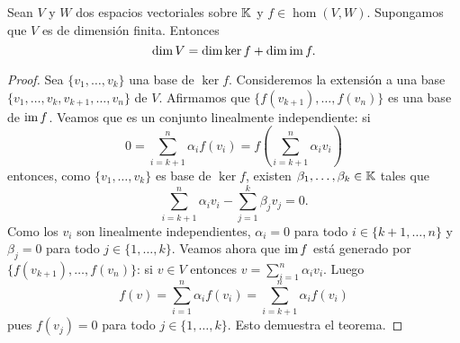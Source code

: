 \begin{thm}
	\label{thm:dimension}
	Sean $V$ y $W$ dos espacios vectoriales sobre $\mathbb{K}$ y $f\in\hom(V,W)$.
	Supongamos que $V$ es de dimensión finita.  Entonces
	\[
		\dim V=\dim\ker f+\dim\operatorname{im} f.
	\]

    \begin{proof} 
        Sea $\{v_1,\dots,v_k\}$ una base de $\ker f$. Consideremos la
        extensión a una base $\{v_1,\dots,v_k,v_{k+1},\dots,v_n\}$ de $V$.
        Afirmamos que $\{f(v_{k+1}),\dots,f(v_n)\}$ es una base de $\operatorname{im} f$. 
        Veamos que es un conjunto linealmente independiente: si 
        \[
            0=\sum_{i=k+1}^n\alpha_if(v_i)=f\left(\sum_{i=k+1}^n\alpha_iv_i\right)
        \]
        entonces, como $\{v_1,\dots,v_k\}$ es base de $\ker f$, 
        existen $\beta_1,\dots,\beta_k\in\mathbb{K}$ tales que 
        \[
            \sum_{i=k+1}^n \alpha_i v_i-\sum_{j=1}^k \beta_jv_j=0.
        \]
        Como los $v_i$ son linealmente independientes, $\alpha_i=0$ para todo $i\in\{k+1,\dots,n\}$ y $\beta_j=0$ para
        todo $j\in\{1,\dots,k\}$. Veamos ahora que $\operatorname{im} f$ está generado por $\{f(v_{k+1}),\dots,f(v_n)\}$: si $v\in V$ 
        entonces $v=\sum_{i=1}^n\alpha_iv_i$. Luego 
        \[
            f(v)=\sum_{i=1}^n\alpha_if(v_i)=\sum_{i=k+1}^n\alpha_if(v_i)
        \]
        pues $f(v_j)=0$ para todo $j\in\{1,\dots,k\}$. Esto demuestra el teorema.
    \end{proof}
%
\end{thm}

